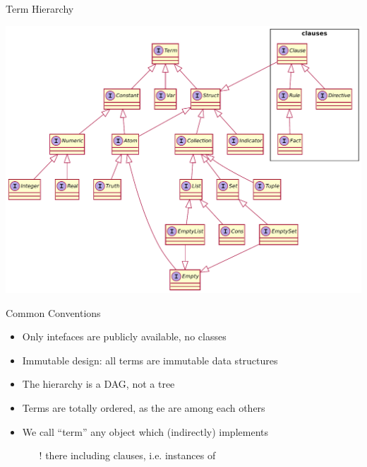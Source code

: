 \documentclass[handout]{beamer}
\begin{document}
\begin{frame}[allowframebreaks]{Term Hierarchy}
    \begin{center}
        \includegraphics[width=.75\linewidth]{img/terms-nofields.pdf}
    \end{center}

    \begin{block}{Common Conventions}
        \begin{itemize}
            \item Only intefaces are publicly available, no classes
            \item Immutable design: all terms are immutable data structures
            \item The hierarchy is a DAG, not a tree
            \item Terms are totally ordered, as the are  among each others
            \item We call ``term'' any object which (indirectly) implements 
            \begin{itemize}
                \item[!] there including clauses, i.e. instances of 
            \end{itemize}
        \end{itemize}
    \end{block}
\end{frame}
\end{document}

